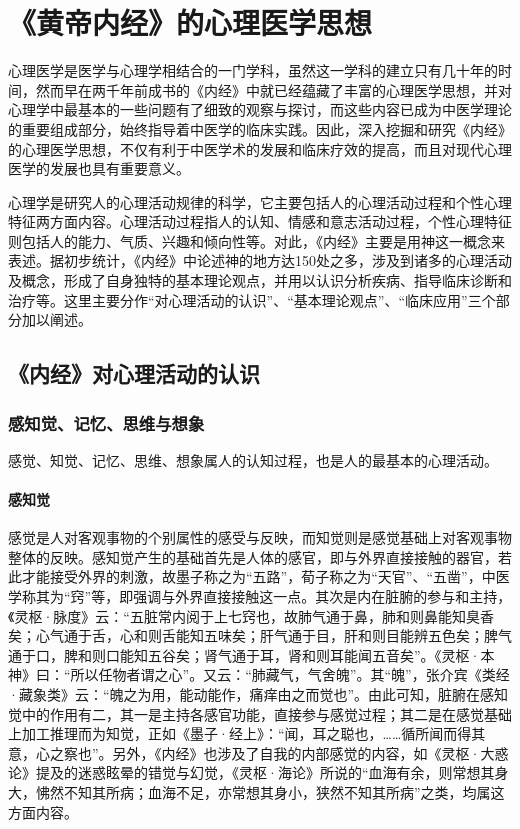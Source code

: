 \documentclass[12pt]{ctexbook}
\begin{document}
\pagestyle{main}
\fi
\chapter{《黄帝内经》的心理医学思想}%

心理医学是医学与心理学相结合的一门学科，虽然这一学科的建立只有几十年的时间，然而早在两千年前成书的《内经》中就已经蕴藏了丰富的心理医学思想，并对心理学中最基本的一些问题有了细致的观察与探讨，而这些内容已成为中医学理论的重要组成部分，始终指导着中医学的临床实践。因此，深入挖掘和研究《内经》的心理医学思想，不仅有利于中医学术的发展和临床疗效的提高，而且对现代心理医学的发展也具有重要意义。

心理学是研究人的心理活动规律的科学，它主要包括人的心理活动过程和个性心理特征两方面内容。心理活动过程指人的认知、情感和意志活动过程，个性心理特征则包括人的能力、气质、兴趣和倾向性等。对此，《内经》主要是用神这一概念来表述。据初步统计，《内经》中论述神的地方达150处之多，涉及到诸多的心理活动及概念，形成了自身独特的基本理论观点，并用以认识分析疾病、指导临床诊断和治疗等。这里主要分作“对心理活动的认识”、“基本理论观点”、“临床应用”三个部分加以阐述。

\section{《内经》对心理活动的认识}%

\subsection{感知觉、记忆、思维与想象}%

感觉、知觉、记忆、思维、想象属人的认知过程，也是人的最基本的心理活动。

\subsubsection{感知觉}%

感觉是人对客观事物的个别属性的感受与反映，而知觉则是感觉基础上对客观事物整体的反映。感知觉产生的基础首先是人体的感官，即与外界直接接触的器官，若此才能接受外界的刺激，故墨子称之为“五路”，荀子称之为“天官”、“五凿”，中医学称其为“窍”等，即强调与外界直接接触这一点。其次是内在脏腑的参与和主持，《灵枢·脉度》云：“五脏常内阅于上七窍也，故肺气通于鼻，肺和则鼻能知臭香矣；心气通于舌，心和则舌能知五味矣；肝气通于目，肝和则目能辨五色矣；脾气通于口，脾和则口能知五谷矣；肾气通于耳，肾和则耳能闻五音矣”。《灵枢·本神》曰：“所以任物者谓之心”。又云：“肺藏气，气舍魄”。其“魄”，张介宾《类经·藏象类》云：“魄之为用，能动能作，痛痒由之而觉也”。由此可知，脏腑在感知觉中的作用有二，其一是主持各感官功能，直接参与感觉过程；其二是在感觉基础上加工推理而为知觉，正如《墨子·经上》：“闻，耳之聪也，……循所闻而得其意，心之察也”。另外，《内经》也涉及了自我的内部感觉的内容，如《灵枢·大惑论》提及的迷惑眩晕的错觉与幻觉，《灵枢·海论》所说的“血海有余，则常想其身大，怫然不知其所病；血海不足，亦常想其身小，狭然不知其所病”之类，均属这方面内容。
\end{document}
